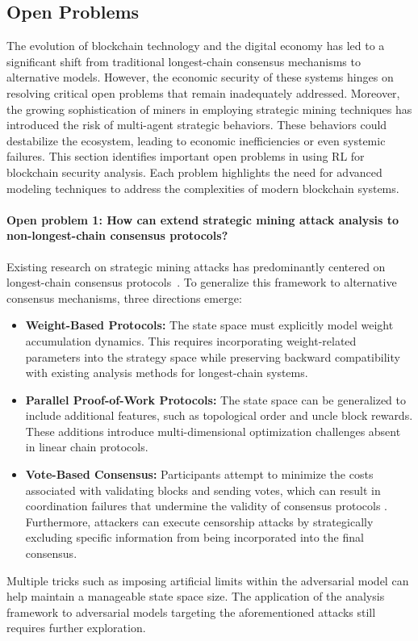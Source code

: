 \subsection{Open Problems}
The evolution of blockchain technology and the digital economy has led to a significant shift from traditional longest-chain consensus mechanisms to alternative models. 
However, the economic security of these systems hinges on resolving critical open problems that remain inadequately addressed.
Moreover, the growing sophistication of miners in employing strategic mining techniques has introduced the risk of multi-agent strategic behaviors. These behaviors could destabilize the ecosystem, leading to economic inefficiencies or even systemic failures.
This section identifies important open problems in using RL for blockchain security analysis. 
Each problem highlights the need for advanced modeling techniques to address the complexities of modern blockchain systems.

\paragraph{Open problem 1: How can extend strategic mining attack analysis to non-longest-chain consensus protocols?}

Existing research on strategic mining attacks has predominantly centered on longest-chain consensus protocols~\cite{eyal2014majority,sapirshtein2016optimal,sarenche2024deep}. 
To generalize this framework to alternative consensus mechanisms, three directions emerge:
\begin{itemize}
    \item \textbf{Weight-Based Protocols:} The state space must explicitly model weight accumulation dynamics. This requires incorporating weight-related parameters into the strategy space while preserving backward compatibility with existing analysis methods for longest-chain systems.
    \item \textbf{Parallel Proof-of-Work Protocols:}  The state space can be generalized to include additional features, such as topological order and uncle block rewards. These additions introduce multi-dimensional optimization challenges absent in linear chain protocols.
    \item \textbf{Vote-Based Consensus:} Participants attempt to minimize the costs associated with validating blocks and sending votes, which can result in coordination failures that undermine the validity of consensus protocols \cite{amoussou2020governing}. Furthermore, attackers can execute censorship attacks \cite{srivastava2024towards} by strategically excluding specific information from being incorporated into the final consensus.
\end{itemize}
Multiple tricks such as imposing artificial limits within the adversarial model \cite{sapirshtein2016optimal,zur2020efficient,hou2019squirrl} can help maintain a manageable state space size.
The application of the analysis framework to adversarial models targeting the aforementioned attacks still requires further exploration.

